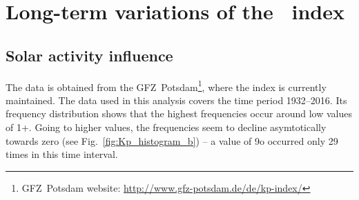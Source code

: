 \section{Long-term variations of the \Kp{}~index}
\label{sec:long_term_variations}

\subsection{Solar activity influence}
The \Kp{} data is obtained from the GFZ~Potsdam\footnote{GFZ~Potsdam website: \url{http://www.gfz-potsdam.de/de/kp-index/}}, where the index is currently maintained. The data used in this analysis covers the time period 1932--2016. Its frequency distribution shows that the highest frequencies occur around low \Kp{} values of 1+. Going to higher \Kp{} values, the frequencies seem to decline asymtotically towards zero (see Fig.~\ref{fig:Kp_histogram_b}) -- a \Kp{} value of 9o occurred only 29 times in this time interval.\\
